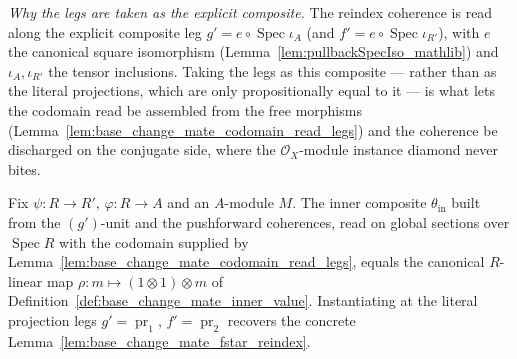 \begin{lemma}

  \label{lem:base_change_mate_fstar_reindex_legs}
  \emph{Why the legs are taken as the explicit composite.} The reindex coherence is read along the
  explicit composite leg \(g' = e \circ \operatorname{Spec}\iota_A\) (and
  \(f' = e \circ \operatorname{Spec}\iota_{R'}\)), with \(e\) the canonical square isomorphism
  (Lemma~\ref{lem:pullbackSpecIso_mathlib}) and \(\iota_A,\iota_{R'}\) the tensor inclusions. Taking
  the legs as this composite — rather than as the literal projections, which are only propositionally
  equal to it — is what lets the codomain read be assembled from the free morphisms
  (Lemma~\ref{lem:base_change_mate_codomain_read_legs}) and the coherence be discharged on the
  conjugate side, where the \(\mathcal{O}_X\)-module instance diamond never bites.

  Fix \(\psi : R \to R'\), \(\varphi : R \to A\) and an \(A\)-module \(M\). The inner composite
  \(\theta_{\mathrm{in}}\) built from the \((g')\)-unit and the pushforward coherences, read on global
  sections over \(\operatorname{Spec} R\) with the codomain supplied by
  Lemma~\ref{lem:base_change_mate_codomain_read_legs}, equals the canonical \(R\)-linear map
  \(\rho : m \mapsto (1 \otimes 1) \otimes m\) of Definition~\ref{def:base_change_mate_inner_value}.
  Instantiating at the literal projection legs \(g' = \operatorname{pr}_1\),
  \(f' = \operatorname{pr}_2\) recovers the concrete Lemma~\ref{lem:base_change_mate_fstar_reindex}.
\end{lemma}
